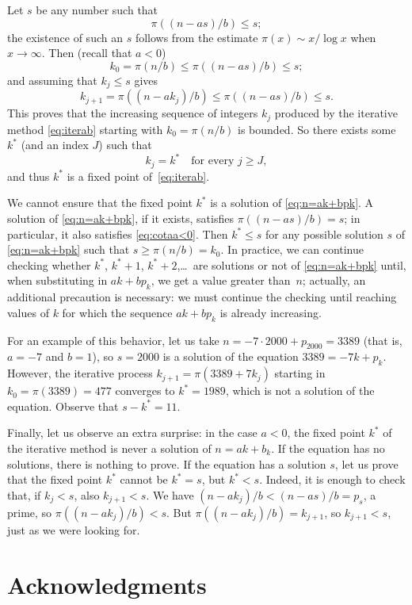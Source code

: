 \documentclass[12pt,reqno]{article}
\begin{document}
Let $s$ be any number such that 
\begin{equation}
\label{eq:cotaa<0}
  \pi((n-as)/b) \le s;
\end{equation}
the existence of such an $s$ follows from the estimate $\pi(x) \sim x/\log x$ when $x \to \infty$.
{}Then (recall that $a<0$)
\[
  k_0 = \pi(n/b) \le \pi((n-as)/b) \le s;
\]
and assuming that $k_j \le s$ gives 
\[
  k_{j+1} = \pi((n-ak_j)/b) \le \pi((n-as)/b) \le s.
\]
This proves that the increasing sequence of integers $k_j$ produced by the iterative method \eqref{eq:iterab} starting with $k_0 = \pi(n/b)$ is bounded.
So there exists some~$k^{*}$ (and an index $J$) such that
\[
  k_j = k^{*} \quad\text{for every } j \ge J,
\]
and thus $k^{*}$ is a fixed point of~\eqref{eq:iterab}.

We cannot ensure that the fixed point $k^{*}$ is a solution of \eqref{eq:n=ak+bpk}.
A solution of \eqref{eq:n=ak+bpk}, if it exists, satisfies $\pi((n-as)/b) = s$;
in particular, it also satisfies \eqref{eq:cotaa<0}. 
Then $k^{*} \le s$ for any possible solution $s$ of \eqref{eq:n=ak+bpk} such that $s \ge \pi(n/b) = k_0$.
In practice, we can continue checking whether $k^{*}$, $k^{*}+1$, $k^{*}+2$,\dots\ are solutions or not 
of \eqref{eq:n=ak+bpk} until, when substituting in $ak+bp_k$, we get a value greater than~$n$; 
actually, an additional precaution is necessary: 
we must continue the checking until reaching values of $k$ for which the sequence $ak+bp_k$ is already increasing.

For an example of this behavior, let us take $n = -7 \cdot 2000 + p_{2000} = 3389$ (that is, $a=-7$ and $b=1$), 
so $s = 2000$ is a solution of the equation $3389 = -7k+p_k$. However, the iterative process $k_{j+1} = \pi(3389+7k_j)$ 
starting in $k_0 = \pi(3389) = 477$ converges to $k^{*} = 1989$, which is not a solution of the equation. Observe that $s-k^{*} = 11$.

Finally, let us observe an extra surprise: in the case $a<0$, the fixed point $k^{*}$ of the iterative method 
is never a solution of $n = ak+b_k$. If the equation has no solutions, there is nothing to prove. 
If the equation has a solution $s$, let us prove that the fixed point $k^{*}$ cannot be $k^{*} = s$, but $k^{*} < s$. 
Indeed, it is enough to check that, if $k_j < s$, also $k_{j+1} < s$. 
We have $(n-ak_j)/b < (n-as)/b = p_s$, a prime, so $\pi((n-ak_j)/b) < s$.
But $\pi((n-ak_j)/b) = k_{j+1}$, so $k_{j+1} < s$, just as we were looking for.

\section{Acknowledgments}
\end{document}
